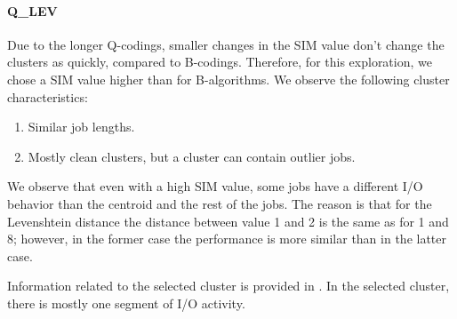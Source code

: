 \documentclass{jhps}
\begin{document}
\FloatBarrier
\paragraph{Q\_LEV}
Due to the longer Q-codings, smaller changes in the SIM value don't change the clusters as quickly, compared to B-codings.
Therefore, for this exploration, we chose a SIM value higher than for B-algorithms.
We observe the following cluster characteristics:
\begin{enumerate}
 \item Similar job lengths.
 \item Mostly clean clusters, but a cluster can contain outlier jobs.
\end{enumerate}

We observe that even with a high SIM value, some jobs have a different I/O behavior than the centroid and the rest of the jobs.
The reason is that for the Levenshtein distance the distance between value 1 and 2 is the same as for 1 and 8; however, in the former case the performance is more similar than in the latter case.

Information related to the selected cluster is provided in .
In the selected cluster, there is mostly one segment of I/O activity.
\end{document}
